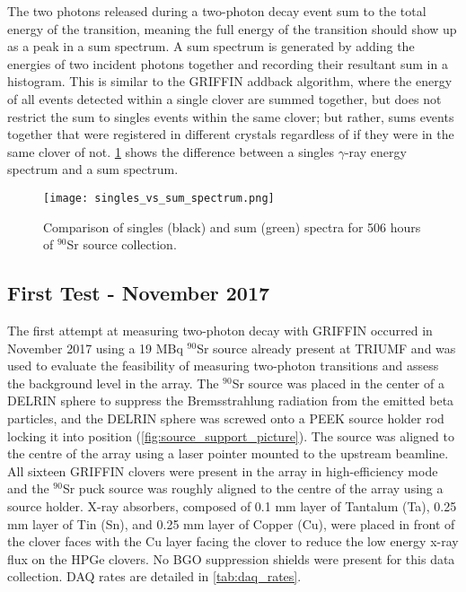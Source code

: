 \documentclass[cnatzke_thesis_proposal.tex]{subfiles}
\begin{document}
The two photons released during a two-photon decay event sum to the total energy of the transition, meaning the full energy of the transition should show up as a peak in a sum spectrum. 
A sum spectrum is generated by adding the energies of two incident photons together and recording their resultant sum in a histogram.
This is similar to the GRIFFIN addback algorithm, where the energy of all events detected within a single clover are summed together, but does not restrict the sum to singles events within the same clover; but rather, sums events together that were registered in different crystals regardless of if they were in the same clover of not. 
\ref{fig:singles_vs_sum_spectrum} shows the difference between a singles $\gamma$-ray energy spectrum and a sum spectrum.

\begin{figure}[htbp]
  \centering
  \texttt{[image: singles\_vs\_sum\_spectrum.png]}
  \caption{Comparison of singles (black) and sum (green) spectra for 506 hours of $^{90}$Sr source collection.}
  \label{fig:singles_vs_sum_spectrum}
\end{figure}

\subsection{First Test - November 2017}
The first attempt at measuring two-photon decay with GRIFFIN occurred in November 2017 using a 19 MBq $^{90}$Sr source already present at TRIUMF and was used to evaluate the feasibility of measuring two-photon transitions and assess the background level in the array.
The $^{90}$Sr source was placed in the center of a DELRIN sphere to suppress the Bremsstrahlung radiation from the emitted beta particles, and the DELRIN sphere was screwed onto a PEEK source holder rod locking it into position (\ref{fig:source_support_picture}).
The source was aligned to the centre of the array using a laser pointer mounted to the upstream beamline.
All sixteen GRIFFIN clovers were present in the array in high-efficiency mode and the $^{90}$Sr puck source was roughly aligned to the centre of the array using a source holder.
X-ray absorbers, composed of 0.1 mm layer of Tantalum (Ta), 0.25 mm layer of Tin (Sn), and 0.25 mm layer of Copper (Cu), were placed in front of the clover faces with the Cu layer facing the clover to reduce the low energy x-ray flux on the HPGe clovers.
No BGO suppression shields were present for this data collection. 
DAQ rates are detailed in \ref{tab:daq_rates}.
\end{document}
